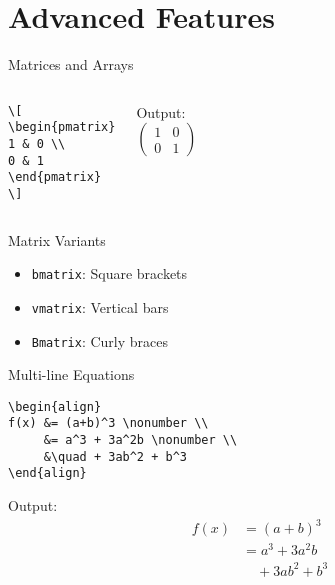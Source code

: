 \documentclass{beamer}
\begin{document}
\section{Advanced Features}
\begin{frame}[fragile]{Matrices and Arrays}
\begin{columns}
\begin{lstlisting}
\[
\begin{pmatrix}
1 & 0 \\
0 & 1
\end{pmatrix}
\]
\end{lstlisting}

Output:
\[
\begin{pmatrix}
1 & 0 \\
0 & 1
\end{pmatrix}
\]
\end{columns}

\begin{alertblock}{Matrix Variants}
\begin{itemize}
\item \texttt{bmatrix}: Square brackets
\item \texttt{vmatrix}: Vertical bars
\item \texttt{Bmatrix}: Curly braces
\end{itemize}
\end{alertblock}
\end{frame}

\begin{frame}[fragile]{Multi-line Equations}
\begin{lstlisting}
\begin{align}
f(x) &= (a+b)^3 \nonumber \\
     &= a^3 + 3a^2b \nonumber \\
     &\quad + 3ab^2 + b^3
\end{align}
\end{lstlisting}

Output:
\begin{align}
f(x) &= (a+b)^3 \nonumber \\
     &= a^3 + 3a^2b \nonumber \\
     &\quad + 3ab^2 + b^3
\end{align}
\end{frame}
\end{document}
